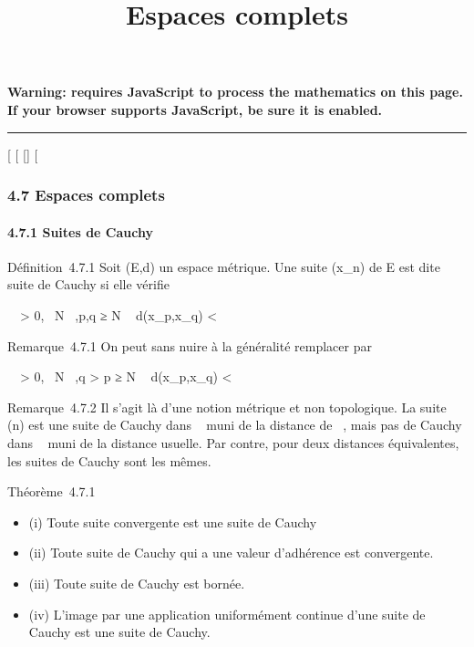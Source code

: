 \documentclass[]{article}
\title{Espaces complets}
\author{}
\date{}
\begin{document}
\maketitle

\textbf{Warning: 
requires JavaScript to process the mathematics on this page.\\ If your
browser supports JavaScript, be sure it is enabled.}

\begin{center}\rule{3in}{0.4pt}\end{center}

[
[
[]
[

\subsubsection{4.7 Espaces complets}

\paragraph{4.7.1 Suites de Cauchy}

Définition~4.7.1 Soit (E,d) un espace métrique. Une suite (x_n)
de E est dite suite de Cauchy si elle vérifie

\forall~~\epsilon > 0,
\exists~N \in {}~,\quad p,q ≥ N \rigtharrow~
d(x_p,x_q) < \epsilon

Remarque~4.7.1 On peut sans nuire à la généralité remplacer par

\forall~~\epsilon > 0,
\exists~N \in {}~,\quad q > p
≥ N \rigtharrow~ d(x_p,x_q) < \epsilon

Remarque~4.7.2 Il s'agit là d'une notion métrique et non topologique. La
suite (n) est une suite de Cauchy dans ~ muni de la distance de
\overline{}~, mais pas de Cauchy dans ~ muni de la
distance usuelle. Par contre, pour deux distances équivalentes, les
suites de Cauchy sont les mêmes.

Théorème~4.7.1

\begin{itemize}
\itemsep1pt\parskip0pt
\item
  (i) Toute suite convergente est une suite de Cauchy
\item
  (ii) Toute suite de Cauchy qui a une valeur d'adhérence est
  convergente.
\item
  (iii) Toute suite de Cauchy est bornée.
\item
  (iv) L'image par une application uniformément continue d'une suite de
  Cauchy est une suite de Cauchy.
\end{itemize}
\end{document}

